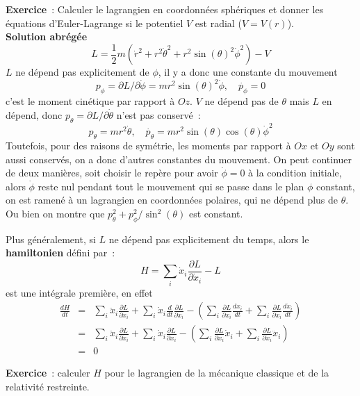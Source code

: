\documentclass[a4paper,11pt]{book}
\begin{document}
\begin{giacjshere}
{\bf Exercice}~: Calculer le lagrangien en coordonn\'ees sph\'eriques
et donner les \'equations d'Euler-Lagrange si le potentiel
$V$ est radial ($V=V(r)$).\\
{\bf Solution abr\'eg\'ee}
$$ L=\frac{1}{2}m(\dot{r}^2+r^2\dot{\theta}^2+r^2\sin(\theta)^2
\dot{\phi}^2)-V$$
$L$ ne d\'epend pas explicitement de $\phi$, il y a donc une constante
du mouvement 
$$p_\phi=\partial L/\partial{\dot{\phi}} = m r^2 \sin(\theta)^2 
\dot{\phi}, \quad \dot{p_\phi}=0$$ 
c'est le moment cin\'etique par rapport \`a $Oz$.
$V$ ne d\'epend pas de $\theta$ mais $L$ en d\'epend, donc
$p_\theta=\partial L/\partial{\dot{\theta}}$ 
n'est pas conserv\'e~:
$$ p_\theta=mr^2\dot{\theta}, 
\quad \dot{p_\theta}=mr^2\sin(\theta)\cos(\theta)\dot{\phi}^2$$
Toutefois, pour des raisons de sym\'etrie, les moments par rapport \`a
$Ox$ et $Oy$ sont aussi conserv\'es, on a donc d'autres constantes
du mouvement. On peut continuer de deux mani\`eres, soit choisir
le rep\`ere pour avoir $\dot{\phi}=0$ \`a la condition initiale, alors
$\dot{\phi}$ reste nul pendant tout le mouvement qui se passe dans
le plan $\phi$ constant, on est ramen\'e \`a un lagrangien en
coordonn\'ees polaires, qui ne d\'epend plus de $\theta$.
Ou bien on montre que $p_\theta^2+p_\phi^2/\sin^2(\theta)$
est constant.

Plus g\'en\'eralement, si $L$ ne d\'epend pas explicitement du temps,
alors le {\bf hamiltonien} d\'efini par~:
$$ H = \sum_i \dot{x}_i \frac{\partial L}{\partial \dot{x}_i} - L$$
est une int\'egrale premi\`ere, en effet
\begin{eqnarray*}
\frac{dH}{dt} &= &\sum_i \ddot{x}_i \frac{\partial L}{\partial
  \dot{x}_i} + \sum_i \dot{x}_i \frac{d}{dt}\frac{\partial
  L}{\partial \dot{x}_i}
- \left(\sum_i \frac{\partial L}{\partial x_i} \frac{dx_i}{dt}
+\sum_i \frac{\partial L}{\partial \dot{x}_i} \frac{d\dot{x}_i}{dt}
\right)\\
& =& 
\sum_i \ddot{x}_i \frac{\partial L}{\partial
  \dot{x}_i} + \sum_i \dot{x}_i \frac{\partial  L}{\partial x_i}
- \left(\sum_i \frac{\partial L}{\partial x_i} \dot{x}_i
+\sum_i \frac{\partial L}{\partial \dot{x}_i} \ddot{x}_i
\right) \\
&=&0
\end{eqnarray*}

{\bf Exercice}~: calculer $H$ pour le lagrangien de la m\'ecanique
classique et de la relativit\'e restreinte.


\end{giacjshere}
\end{document}
